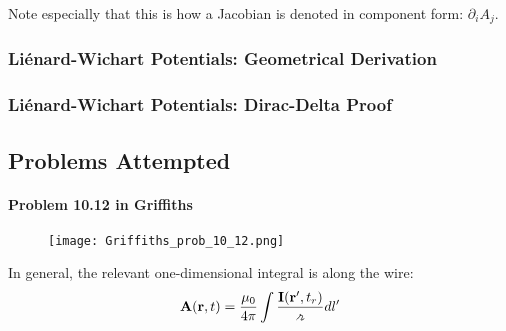 Note especially that this is how a Jacobian is denoted in component form: \(\partial _i A_j\).

\subsubsection*{Liénard-Wichart Potentials: Geometrical Derivation}
\subsubsection*{Liénard-Wichart Potentials: Dirac-Delta Proof}
\subsection*{Problems Attempted}
\paragraph{Problem 10.12 in Griffiths}
\begin{figure}[h]
    \centering
    \texttt{[image: Griffiths\_prob\_10\_12.png]}
\end{figure}

In general, the relevant one-dimensional integral is along the wire: \begin{align*}
    \mathbf{A}(\mathbf{r}, t) = \frac{\mu_0}{4 \pi } \int \frac{\mathbf{I}(\mathbf{r}^{\prime} , t_r)}{\griffr[2] } d l ^{\prime} 
\end{align*}

